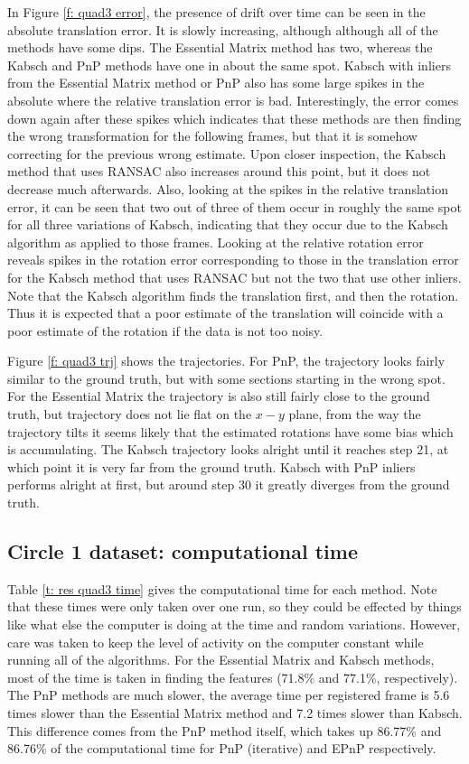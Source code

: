 \documentclass[12pt,a4paper]{article}
\begin{document}
    In Figure \ref{f: quad3 error}, the presence of drift over time can be seen in the absolute translation error. It is slowly increasing, although although all of the methods have some dips. The Essential Matrix method has two, whereas the Kabsch and PnP methods have one in about the same spot. Kabsch with inliers from the Essential Matrix method or PnP also has some large spikes in the absolute where the relative translation error is bad. Interestingly, the error comes down again after these spikes which indicates that these methods are then finding the wrong transformation for the following frames, but that it is somehow correcting for the previous wrong estimate. Upon closer inspection, the Kabsch method that uses RANSAC also increases around this point, but it does not decrease much afterwards. Also, looking at the spikes in the relative translation error, it can be seen that two out of three of them occur in roughly the same spot for all three variations of Kabsch, indicating that they occur due to the Kabsch algorithm as applied to those frames. Looking at the relative rotation error reveals spikes in the rotation error corresponding to those in the translation error for the Kabsch method that uses RANSAC but not the two that use other inliers. Note that the Kabsch algorithm finds the translation first, and then the rotation. Thus it is expected that a poor estimate of the translation will coincide with a poor estimate of the rotation if the data is not too noisy. 


    Figure \ref{f: quad3 trj} shows the trajectories. For PnP, the trajectory looks fairly similar to the ground truth, but with some sections starting in the wrong spot. For the Essential Matrix the trajectory is also still fairly close to the ground truth, but trajectory does not lie flat on the $x-y$ plane, from the way the trajectory tilts it seems likely that the estimated rotations have some bias which is accumulating. The Kabsch trajectory looks alright until it reaches step 21, at which point it is very far from the ground truth. Kabsch with PnP inliers performs alright at first, but around step 30 it greatly diverges from the ground truth. 

  \subsection{Circle 1 dataset: computational time}
    \label{ssec: res time}

    \noindent
    Table \ref{t: res quad3 time} gives the computational time for each method. Note that these times were only taken over one run, so they could be effected by things like what else the computer is doing at the time and random variations. However, care was taken to keep the level of activity on the computer constant while running all of the algorithms. For the Essential Matrix and Kabsch methods, most of the time is taken in finding the features (71.8\% and 77.1\%, respectively). The PnP methods are much slower, the average time per registered frame is 5.6 times slower than the Essential Matrix method and 7.2 times slower than Kabsch. This difference comes from the PnP method itself, which takes up 86.77\% and 86.76\% of the computational time for PnP (iterative) and EPnP respectively.
     
\end{document}
